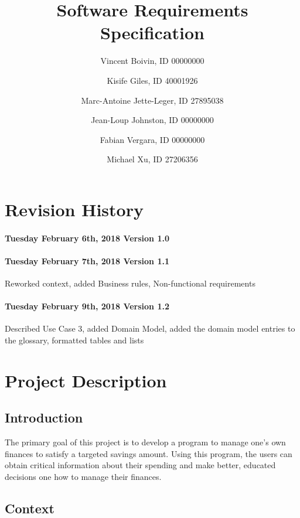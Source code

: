\documentclass[letterpaper]{article}
\title{Software Requirements Specification}
\author{
	Vincent Boivin, ID 00000000 \and
	Kisife Giles, ID 40001926 \and
	Marc-Antoine Jette-Leger, ID 27895038 \and
	Jean-Loup Johnston, ID 00000000 \and
	Fabian Vergara, ID 00000000 \and
	Michael Xu, ID 27206356
}
\begin{document}
	
\maketitle

\newpage

\section{Revision History}

	\paragraph{Tuesday February 6th, 2018 Version 1.0}  
	
	\paragraph{Tuesday February 7th, 2018 Version 1.1}  
	Reworked context, added Business rules, Non-functional requirements
	
	\paragraph{Tuesday February 9th, 2018 Version 1.2}  
	Described Use Case 3, added Domain Model, added the domain model entries to the glossary, formatted tables and lists
	
\newpage

\tableofcontents

\newpage
	
\section{Project Description}

	\subsection{Introduction}
	
		The primary goal of this project is to develop a program to manage one’s own finances to satisfy a targeted savings amount. Using this program, the users can obtain critical information about their spending and make better, educated decisions one how to manage their finances.
	
	\subsection{Context}
	
\end{document}
